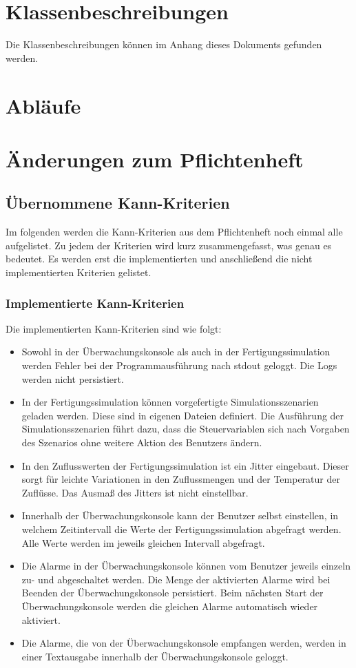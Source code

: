 \documentclass[parskip=full]{scrartcl}
\begin{document}
\section{Klassenbeschreibungen}
Die Klassenbeschreibungen können im Anhang dieses Dokuments gefunden werden.

\section{Abläufe}

\section{Änderungen zum Pflichtenheft}

\subsection{\"Ubernommene Kann-Kriterien}
Im folgenden werden die Kann-Kriterien aus dem Pflichtenheft noch einmal alle aufgelistet. Zu jedem der Kriterien wird
kurz zusammengefasst, was genau es bedeutet. Es werden erst die implementierten und anschlie{\ss}end die nicht implementierten
Kriterien gelistet.

\subsubsection{Implementierte Kann-Kriterien}
Die implementierten Kann-Kriterien sind wie folgt:

\begin{itemize}
    \item Sowohl in der \"Uberwachungskonsole als auch in der Fertigungssimulation werden Fehler bei der Programmausf\"uhrung
    nach stdout geloggt. Die Logs werden nicht persistiert.
    \item In der Fertigungssimulation k\"onnen vorgefertigte Simulationsszenarien geladen werden. Diese sind in eigenen Dateien definiert.
    Die Ausführung der Simulationsszenarien f\"uhrt dazu, dass die Steuervariablen sich nach Vorgaben des Szenarios ohne
    weitere Aktion des Benutzers \"andern.
    \item In den Zuflusswerten der Fertigungssimulation ist ein Jitter eingebaut. Dieser sorgt f\"ur leichte Variationen in den
    Zuflussmengen und der Temperatur der Zufl\"usse. Das Ausma{\ss} des Jitters ist nicht einstellbar.
    \item Innerhalb der \"Uberwachungskonsole kann der Benutzer selbst einstellen, in welchem Zeitintervall die Werte der
    Fertigungssimulation abgefragt werden. Alle Werte werden im jeweils gleichen Intervall abgefragt.
    \item Die Alarme in der \"Uberwachungskonsole k\"onnen vom Benutzer jeweils einzeln zu- und abgeschaltet werden. Die Menge der
    aktivierten Alarme wird bei Beenden der \"Uberwachungskonsole persistiert. Beim n\"achsten Start der \"Uberwachungskonsole
    werden die gleichen Alarme automatisch wieder aktiviert.
    \item Die Alarme, die von der \"Uberwachungskonsole empfangen werden, werden in einer Textausgabe innerhalb der
    \"Uberwachungskonsole geloggt.
\end{itemize}
\end{document}
